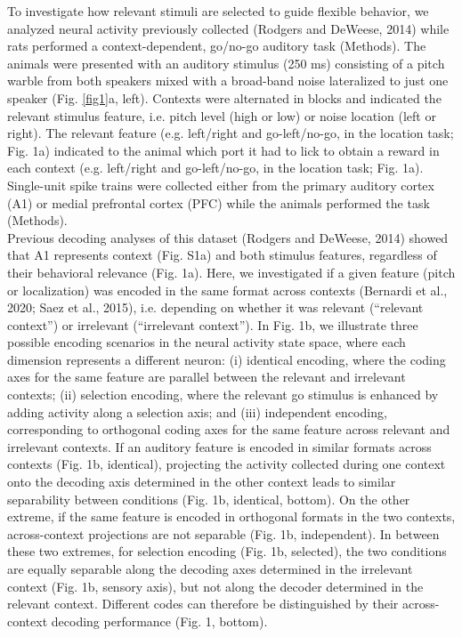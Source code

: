 \documentclass[12pt]{article}
\begin{document}
To investigate how relevant stimuli are selected to guide flexible behavior, we analyzed neural activity previously collected (Rodgers and DeWeese, 2014) while rats performed a context-dependent, go/no-go auditory task (Methods). The animals were presented with an auditory stimulus (250 ms) consisting of a pitch warble from both speakers mixed with a broad-band noise  lateralized to just one speaker (Fig. \ref{fig1}a, left). Contexts were alternated in blocks and indicated the relevant stimulus feature, i.e. pitch level (high or low) or noise location (left or right). The relevant feature (e.g. left/right and go-left/no-go, in the location task; Fig. 1a) indicated to the animal which port it had to lick to obtain a reward in each context (e.g. left/right and go-left/no-go, in the location task; Fig. 1a).  Single-unit spike trains were collected either from the primary auditory cortex (A1) or medial prefrontal cortex (PFC) while the animals performed the task (Methods). \\

Previous decoding analyses of this dataset (Rodgers and DeWeese, 2014) showed that A1 represents context (Fig. S1a) and both stimulus features, regardless of their behavioral relevance (Fig. 1a). Here, we investigated if a given feature (pitch or localization) was encoded in the same format across contexts (Bernardi et al., 2020; Saez et al., 2015), i.e. depending on whether it was relevant (“relevant context”) or irrelevant (“irrelevant context”). In Fig. 1b, we illustrate three possible encoding scenarios in the neural activity state space, where each dimension represents a different neuron: (i) identical encoding, where the coding axes for the same feature are parallel between the relevant and irrelevant contexts; (ii) selection encoding, where the relevant go stimulus is enhanced by adding activity along a selection axis; and (iii) independent encoding, corresponding to orthogonal coding axes for the same feature across relevant and irrelevant contexts. If an auditory feature is encoded in similar formats across contexts (Fig. 1b, identical), projecting the activity collected during one context onto the decoding axis determined in the other context leads to similar separability between conditions (Fig. 1b, identical, bottom). On the other extreme, if the same feature is encoded in orthogonal formats in the two contexts, across-context projections are not separable (Fig. 1b, independent). In between these two extremes, for selection encoding (Fig. 1b, selected), the two conditions are equally separable along the decoding axes determined in the irrelevant context (Fig. 1b, sensory axis), but not along the decoder determined in the relevant context. Different codes can therefore be distinguished by their across-context decoding performance (Fig. 1, bottom). \\
\end{document}
